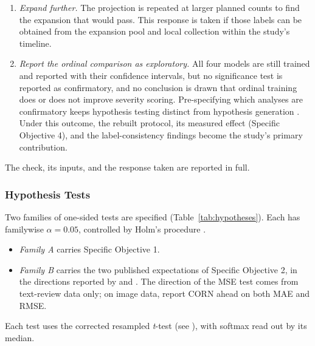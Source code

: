 \documentclass{icsthesis}
\newcommand{\secref}[1]{\textit{\nameref{#1}}}
\begin{document}
\begin{mainmatter}
					\begin{enumerate}
						\item \textit{Expand further.} The projection is repeated at larger planned
							counts to find the expansion that would pass. This response is taken if
							those labels can be obtained from the expansion pool and local
							collection within the study's timeline.
						\item \textit{Report the ordinal comparison as exploratory.} All four models
							are still trained and reported with their confidence intervals, but no
							significance test is reported as confirmatory, and no conclusion is
							drawn that ordinal training does or does not improve severity scoring.
							Pre-specifying which analyses are confirmatory keeps hypothesis testing
							distinct from hypothesis generation \citep{nosek2018}. Under this
							outcome, the rebuilt protocol, its measured effect (Specific Objective
							4), and the label-consistency findings become the study's primary
							contribution.
					\end{enumerate}

					The check, its inputs, and the response taken are reported in full.

				\subsubsection{Hypothesis Tests}\label{sec:hypotheses}

					Two families of one-sided tests are specified (Table~\ref{tab:hypotheses}).
					Each has familywise $\alpha = 0.05$, controlled by Holm's procedure \citep{holm1979}.

					\begin{itemize}
						\item \textit{Family A} carries Specific Objective 1.
						\item \textit{Family B} carries the two published expectations of Specific
							Objective 2, in the directions reported by \citet{shi2023corn} and
							\citet{fuchs2022}. The direction of the MSE test comes from text-review
							data only; on image data, \citet{shi2023corn} report CORN ahead on both
							MAE and RMSE.
					\end{itemize}

					Each test uses the corrected resampled \textit{t}-test (see \secref{sec:stats}),
					with softmax read out by its median.


\end{mainmatter}
\end{document}
